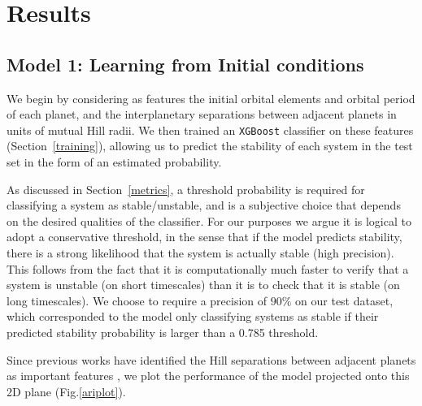 \section{Results} \label{results}
\subsection{Model 1: Learning from Initial conditions} \label{IC}
We begin by considering as features the initial orbital elements and orbital period of each planet, and the interplanetary separations between adjacent planets in units of mutual Hill radii. 
We then trained an {\tt XGBoost} classifier on these features (Section~\ref{training}), allowing us to predict the stability of each system in the test set in the form of an estimated probability. 

As discussed in Section~\ref{metrics}, a threshold probability is required for classifying a system as stable/unstable, and is a subjective choice that depends on the desired qualities of the classifier.
For our purposes we argue it is logical to adopt a conservative threshold, in the sense that if the model predicts stability, there is a strong likelihood that the system is actually stable (high precision).
This follows from the fact that it is computationally much faster to verify that a system is unstable (on short timescales) than it is to check that it is stable (on long timescales).
We choose to require a precision of $90\%$ on our test dataset, which corresponded to the model only classifying systems as stable if their predicted stability probability is larger than a 0.785 threshold.

Since previous works have identified the Hill separations between adjacent planets as important features \citep{Chambers1996, Marzari14}, we plot the performance of the model projected onto this 2D plane (Fig.\:\ref{ariplot}).

